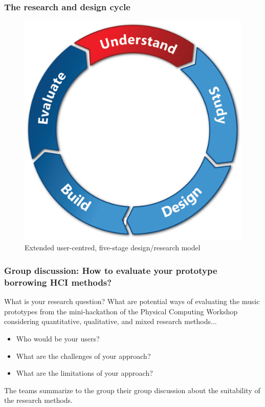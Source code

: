 \documentclass[screen, aspectratio=169]{beamer}
\begin{document}
\begin{frame}
\frametitle{The research and design cycle}
\begin{figure}
\includegraphics[scale=0.15]{img/design-cycle.pdf}
\caption{Extended user-centred, five-stage design/research model \cite{Harper.et.al.2008.being}}
\end{figure}
\end{frame}
%
%
\begin{frame}
\frametitle{Group discussion: How to evaluate your prototype borrowing HCI methods?}
What is your research question? What are potential ways of evaluating the music prototypes from the mini-hackathon of the Physical Computing Workshop considering quantitative, qualitative, and mixed research methods...
\begin{itemize}
\item Who would be your users? 
\item What are the challenges of your approach? 
\item What are the limitations of your approach? 
\end{itemize}
The teams summarize to the group their group discussion about the suitability of the research methods.
\end{frame}
\end{document}
